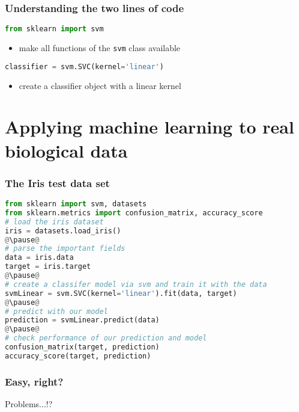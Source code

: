 \begin{frame}[c,fragile]\frametitle{Understanding the two lines of code}

  \begin{lstlisting}[language=Python]
from sklearn import svm
  \end{lstlisting}
  \begin{itemize}
    \item {\small make all functions of the \texttt{svm} class available}
  \end{itemize}
  
\pause
  \begin{lstlisting}[language=Python]
classifier = svm.SVC(kernel='linear')
  \end{lstlisting}
  \begin{itemize}
    \item {\small create a classifier object with a linear kernel}
  \end{itemize}

\end{frame}

\section[Iris data]{Applying machine learning to real biological data}

\begin{frame}[c, fragile]\frametitle{The Iris test data set}

  \begin{lstlisting}[language=Python]
from sklearn import svm, datasets
from sklearn.metrics import confusion_matrix, accuracy_score
# load the iris dataset
iris = datasets.load_iris()
@\pause@
# parse the important fields
data = iris.data
target = iris.target
@\pause@
# create a classifer model via svm and train it with the data
svmLinear = svm.SVC(kernel='linear').fit(data, target)
@\pause@
# predict with our model
prediction = svmLinear.predict(data)
@\pause@
# check performance of our prediction and model
confusion_matrix(target, prediction)
accuracy_score(target, prediction)
  \end{lstlisting}
\end{frame}

\begin{frame}[c, fragile]\frametitle{Easy, right?}
  \begin{block}{Problems...!?}
  \end{block}
\end{frame}

